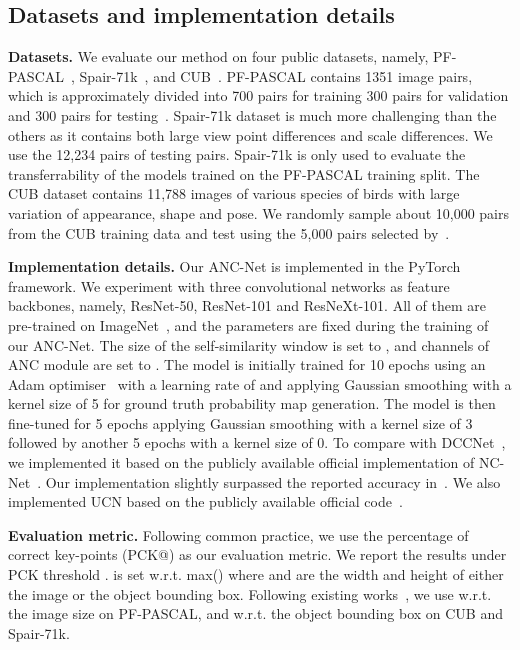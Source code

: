 \documentclass[10pt,twocolumn,letterpaper]{article}
\begin{document}
\subsection{Datasets and implementation details}
\noindent
\textbf{Datasets.} We evaluate our method on four public datasets, namely, PF-PASCAL~\cite{ham2018proposal_flow},  Spair-71k~\cite{min2019hyperpixel}, and CUB~\cite{Welinder_2010_CUB}. 
PF-PASCAL contains 1351 image pairs, which is approximately divided into 700 pairs for training 300 pairs for validation and 300 pairs for testing~\cite{han2017scnet,Rocco_NIPS18_NCNet}. 
Spair-71k dataset is much more challenging than the others as it contains both large view point differences and scale differences. We use the 12,234 pairs of testing pairs. Spair-71k is only used to evaluate the transferrability of the models trained on the PF-PASCAL training split. 
The CUB dataset contains 11,788 images of various species of birds with large variation of appearance, shape and pose. We randomly sample about 10,000 pairs from the CUB training data and test using the 5,000 pairs selected by~\cite{Krause_CVPR15_FineGrained}.

\noindent
\textbf{Implementation details.}
Our ANC-Net is implemented in the PyTorch~\cite{paszke2017automatic} framework.
We experiment with three convolutional networks as feature backbones, namely, ResNet-50, ResNet-101 and ResNeXt-101.
All of them are pre-trained on ImageNet~\cite{Li_CVPR09_ImageNet}, and the parameters are fixed during the training of our ANC-Net. 
The size of the self-similarity window is set to ,
and channels of ANC module are set to .
The model is initially trained for 10 epochs using an Adam optimiser~\cite{Kingma_ICLR15_Adam} with a learning rate of  and applying  Gaussian smoothing with a kernel size of 5 for ground truth probability map generation. 
The model is then fine-tuned for 5 epochs applying Gaussian smoothing with a kernel size of 3 followed by another 5 epochs with a kernel size of 0. 
To compare with DCCNet~\cite{Huang_ICCV19_DCCNet}, we implemented it based on the publicly available official implementation of NC-Net~\cite{Rocco_NIPS18_NCNet}.
Our implementation slightly surpassed the reported accuracy in~\cite{Huang_ICCV19_DCCNet}.
We also implemented UCN based on the publicly available official code~\cite{Choy_NIPS16_UCN}. 

\noindent
\textbf{Evaluation metric.}
Following common practice, we use the percentage of correct key-points (PCK@) as our evaluation metric. We report the results under PCK threshold .
 is set w.r.t. max() where  and  are the width and height of either the image or the object bounding box. 
Following existing works~\cite{han2017scnet,Rocco_NIPS18_NCNet, Lee2019SFNet,min2019hyperpixel}, we use  w.r.t. the image size on PF-PASCAL, and w.r.t. the object bounding box on CUB and Spair-71k.
\end{document}
